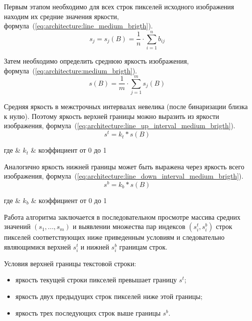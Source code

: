 Первым этапом необходимо для всех строк пикселей исходного изображения находим их средние значения яркости, формула~(\ref{eq:architecture:line_medium_brigth}).
\begin{equation}
  \label{eq:architecture:line_medium_brigth}
  s_j = s_j(B) = \frac{1}{n}\cdot\sum\limits_{i=1}^{n} b_{ij}
\end{equation}

Затем необходимо определить среднюю яркость изображения, формула~(\ref{eq:architecture:medium_brigth}).
\begin{equation}
  \label{eq:architecture:medium_brigth}
  s(B) = \frac{1}{m}\cdot\sum\limits_{j=1}^{m} s_j(B)
\end{equation}

Средняя яркость в межстрочных интервалах невелика (после бинаризации близка к нулю). Поэтому яркость верхней границы можно выразить из яркости изображения, формула~(\ref{eq:architecture:line_up_interval_medium_brigth}).
\begin{equation}
  \label{eq:architecture:line_up_interval_medium_brigth}
  s^{t} = k_{t} * s(B)
\end{equation}
\begin{explanation}
где & $ k_{t} $ & коэффициент от 0 до 1
\end{explanation}

Аналогично яркость нижней границы может быть выражена через яркость всего изображения, формула~(\ref{eq:architecture:line_down_interval_medium_brigth}).
\begin{equation}
  \label{eq:architecture:line_down_interval_medium_brigth}
  s^{b} = k_{b} * s(B)
\end{equation}
\begin{explanation}
где & $ k_{b} $ & коэффициент от 0 до 1
\end{explanation}

Работа алгоритма заключается в последовательном просмотре массива средних значений $ (s_1,...,s_m) $ и выявлении множества пар индексов $ (s^t_i,s^b_i) $ строк пикселей соответствующих ниже приведенным условиям и следовательно являющимися верхней $ s^t_i $ и нижней $ s^b_i $ границам строк. 

Условия верхней границы текстовой строки:
\begin{itemize}
  \item яркость текущей строки пикселей превышает границу $ s^{t} $;
  \item яркость двух предыдущих строк пикселей ниже этой границы;
  \item яркость трех последующих строк выше границы $ s^{b} $.
\end{itemize}

